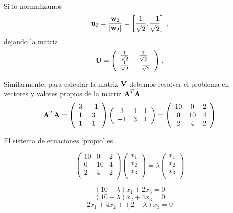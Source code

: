 \documentclass[
]{agujournal2019}
\begin{document}
Si lo normalizamos
\[{\textbf u}_2=\frac{{\textbf w}_2}{|{\textbf w}_2|}=\left[ \frac{1}{\sqrt{2}}, \frac{-1}{\sqrt{2}} \right]\,,\]
dejando la matriz \[{\textbf U}=\left(\begin{array}{cc}
  \frac{1}{\sqrt{2}} & \frac{1}{\sqrt{2}} \\
  \frac{1}{\sqrt{2}} & -\frac{1}{\sqrt{2}} \\
      \end{array}\right)\,.\]

Similarmente, para calcular la matriz \({\textbf V}\) debemos resolver
el problema en vectores y valores propios de la matriz
\({\textbf A}^T{\textbf A}\)
\[{\textbf A}^T{\textbf A}=\left(\begin{array}{ccc}
  3 & -1 \\
  1 & 3 \\
  1 & 1 \\
      \end{array}\right)\left(\begin{array}{ccc}
  3 & 1 & 1\\
  -1 & 3 & 1\\
      \end{array}\right)=
      \left(\begin{array}{ccc}
  10 & 0 & 2 \\
  0 & 10 & 4\\
  2 & 4 & 2\\
      \end{array}\right)
      \]

El sistema de ecuaciones `propio' es

\[\left(\begin{array}{ccc}
  10 & 0 & 2 \\
  0 & 10 & 4\\
  2 & 4 & 2\\
      \end{array}\right)\left(\begin{array}{c}
  x_1 \\
  x_2 \\
  x_3 \\
      \end{array}\right)=\lambda \left(\begin{array}{c}
  x_1 \\
  x_2 \\
  x_3 \\
      \end{array}\right)\]

\[(10-\lambda)x_1 + 2x_3=0\] \[(10-\lambda)x_2 + 4x_3=0\]
\[2x_1 + 4x_2 + (2-\lambda)x_3=0\]
\end{document}
